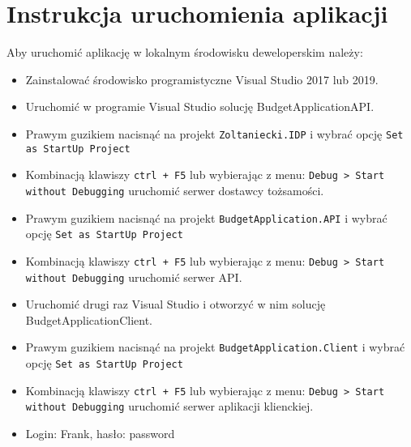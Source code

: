 \chapter{Instrukcja uruchomienia aplikacji}

Aby uruchomić aplikację w lokalnym środowisku deweloperskim należy:

\begin{itemize}
\item Zainstalować środowisko programistyczne Visual Studio 2017 lub 2019. 
\item Uruchomić w programie Visual Studio solucję BudgetApplicationAPI.
\item Prawym guzikiem nacisnąć na projekt \texttt{Zoltaniecki.IDP} i wybrać opcję \texttt{Set as StartUp Project}
\item Kombinacją klawiszy \texttt{ctrl + F5} lub wybierając z menu: \texttt{Debug > Start without Debugging} uruchomić serwer dostawcy tożsamości.
\item Prawym guzikiem nacisnąć na projekt \texttt{BudgetApplication.API} i wybrać opcję \texttt{Set as StartUp Project}
\item Kombinacją klawiszy \texttt{ctrl + F5} lub wybierając z menu: \texttt{Debug > Start without Debugging} uruchomić serwer API.
\item Uruchomić drugi raz Visual Studio i otworzyć w nim solucję BudgetApplicationClient.
\item Prawym guzikiem nacisnąć na projekt \texttt{BudgetApplication.Client} i wybrać opcję \texttt{Set as StartUp Project}
\item Kombinacją klawiszy \texttt{ctrl + F5} lub wybierając z menu: \texttt{Debug > Start without Debugging} uruchomić serwer aplikacji klienckiej.
\item Login: Frank, hasło: password
\end{itemize}


